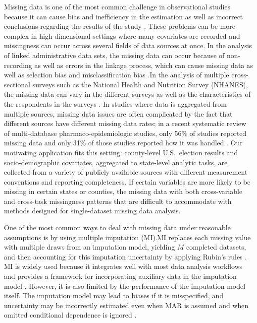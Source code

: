 \documentclass[12pt]{article}
\begin{document}
Missing data is one of the most common challenge in observational studies because it can cause bias and inefficiency in the estimation as well as incorrect conclusions regarding the results of the study \citep{little_statistical_2019,carpenter_multiple_2012}.
These problems can be more complex in high-dimensional settings where many covariates are recorded and missingness can occur across several fields of data sources at once. In the analysis of linked administrative data sets, the missing data can occur because of non-recording as well as errors in the linkage process, which can cause missing data as well as selection bias and misclassification bias \citep{harron_challenges_2017,shaw_biases_2022}.In the analysis of multiple cross-sectional surveys such as the National Health and Nutrition Survey (NHANES), the missing data can vary in the different surveys as well as the characteristics of the respondents in the surveys  \citep{schenker_multiple_2011}. In studies where data is aggregated from multiple sources, missing data issues are often complicated by the fact that different sources have different missing data rates; in a recent systematic review of multi-database pharmaco-epidemiologic studies, only 56\% of studies reported missing data and only 31\% of those studies reported how it was handled \citep{hunt_systematic_2021}.  Our motivating application fits this setting: county-level U.S.\ election results and socio-demographic covariates, aggregated to state-level analytic tasks, are collected from a variety of publicly available sources with different measurement conventions and reporting completeness. If certain variables are more likely to be missing in certain states or counties, the missing data with both cross-variable and cross-task missingness patterns that are difficult to accommodate with methods designed for single-dataset missing data analysis.

One of the most common ways to deal with missing data under reasonable assumptions is by using multiple imputation (MI).MI replaces each missing value with multiple draws from an imputation model, yielding $M$ completed datasets, and then accounting for this imputation uncertainty by applying Rubin’s rules \citep{rubin_multiple_1987,little_statistical_2019}. MI is widely used because it integrates well with most data analysis workflows and provides a framework for incorporating auxiliary data in the imputation model  \citep{schafer_missing_2002,murray_multiple_2018}. However, it is also limited by the performance of the imputation model itself. The imputation model may lead to biases if it is misspecified, and uncertainty may be incorrectly estimated even when MAR is assumed and when omitted conditional dependence is ignored  \citep{meng_multiple-imputation_1994,murray_multiple_2018}.
\end{document}
